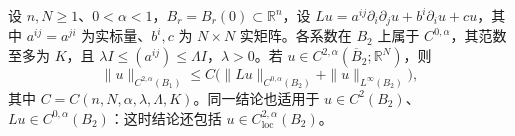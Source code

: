 \begin{theorem}[内部 Schauder 估计]\label{g3:thm:interior-schauder}
	设 \(n,N\ge1\)、\(0<\alpha<1\)，\(B_r=B_r(0)\subset\mathbb R^n\)，设 \(Lu=a^{ij}\partial_i\partial_ju+b^i\partial_i u+cu\)，其中 \(a^{ij}=a^{ji}\) 为实标量、\(b^i,c\) 为 \(N\times N\) 实矩阵。各系数在 \(B_2\) 上属于 \(C^{0,\alpha}\)，其范数至多为 \(K\)，且
	\(\lambda I\le(a^{ij})\le\Lambda I\)，\(\lambda>0\)。若 \(u\in C^{2,\alpha}(\overline B_2;\mathbb R^N)\)，则
	\begin{equation}\label{g3:eq:interior-schauder}
		\|u\|_{C^{2,\alpha}(B_1)}
		\le C\bigl(\|Lu\|_{C^{0,\alpha}(B_2)}+\|u\|_{L^\infty(B_2)}\bigr),
	\end{equation}
	其中 \(C=C(n,N,\alpha,\lambda,\Lambda,K)\)。同一结论也适用于 \(u\in C^2(B_2)\)、\(Lu\in C^{0,\alpha}(B_2)\)：这时结论还包括 \(u\in C^{2,\alpha}_{\mathrm{loc}}(B_2)\)。
\end{theorem}

